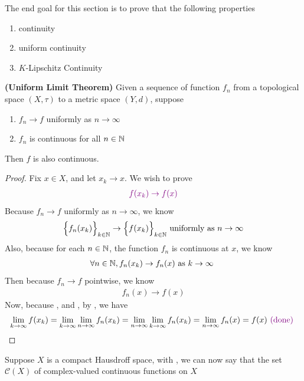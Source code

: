 \documentclass{report}
\begin{document}
\label{UCaCH}
\begin{mdframed}
The end goal for this section is to prove that the following properties 
\begin{enumerate}[label=(\alph*)]
  \item continuity 
  \item uniform continuity 
  \item $K$-Lipschitz Continuity 
\end{enumerate}
\end{mdframed}
\begin{theorem}
\label{ULT}
\textbf{(Uniform Limit Theorem)} Given a sequence of function $f_n$ from a topological space $(X,\tau)$ to a metric space $(Y,d)$, suppose 
\begin{enumerate}[label=(\alph*)]
  \item $f_n\to f$ uniformly as $n\to \infty$
  \item $f_n$ is continuous for all  $n\in\mathbb{N}$ 
\end{enumerate}
Then $f$ is also continuous. 
\end{theorem}
\begin{proof}
Fix $x \in X$, and let $x_k\to x$. We wish to prove
\begin{align*}
  \textcolor{violet}{f(x_k)\to f(x)}
\end{align*}
Because $f_n\to f$ uniformly as $n\to \infty$, we know 
\begin{align}
\label{282e1}
\Big\{ f_n(x_k) \Big\}_{k\in\mathbb{N}}\to \Big\{ f(x_k) \Big\}_{k\in\mathbb{N}}\text{ uniformly as }n\to \infty
\end{align}
Also, because for each $n\in\mathbb{N}$, the function $f_n$ is continuous at $x$, we know 
\begin{align}
\label{282e2}
\forall n\in\mathbb{N}, f_n(x_k)\to f_n(x)\text{ as $k\to \infty$ }
\end{align}
Then because $f_n\to f$ pointwise, we know 
\begin{align}
\label{282e3}
f_n(x)\to f(x)
\end{align}
Now, because ,   and  , by , we have
\begin{align*}
\lim_{k\to \infty}f(x_k)=\lim_{k\to \infty}\lim_{n\to \infty}f_n(x_k)=\lim_{n\to \infty}\lim_{k\to \infty}f_n(x_k)=\lim_{n\to \infty}f_n(x)=f(x)\textcolor{violet}{\text{ (done) }}
\end{align*}
\end{proof}
\begin{mdframed}
Suppose $X$ is a compact Hausdroff space,  with , we can now say that the set $\mathcal{C}(X)$ of complex-valued continuous functions on $X$ 
\end{mdframed}
\end{document}
